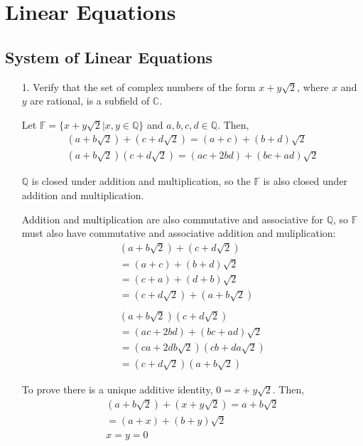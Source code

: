 \documentclass{article}
\begin{document}
\section{Linear Equations}

\setcounter{subsection}{1} %

\subsection{System of Linear Equations}

\begin{enumerate}[listparindent=\parindent]
\item[1.] Verify that the set of complex numbers of the form \(x + y\sqrt{2}\),
    where \(x\) and \(y\) are rational, is a subfield of \(\mathbb C\).

Let \(\mathbb F = \{x + y\sqrt{2} | x, y \in \mathbb Q\}\) and \(a, b, c, d \in \mathbb Q\). Then,
\begin{gather*}
    (a + b\sqrt{2}) + (c + d\sqrt{2}) = (a + c) + (b + d)\sqrt{2} \\
    (a + b\sqrt{2})(c + d\sqrt{2}) = (ac + 2bd) + (bc + ad)\sqrt{2}
\end{gather*}

\(\mathbb Q\) is closed under addition and multiplication,
so the \(\mathbb F\) is also closed under addition and multiplication.

Addition and multiplication are also commutative and associative for \(\mathbb Q\),
so \(\mathbb F\) must also have commutative and associative addition and muliplication:
\begin{gather*}
    (a + b\sqrt{2}) + (c + d\sqrt{2}) \\
    = (a + c) + (b + d)\sqrt{2} \\
    = (c + a) + (d + b)\sqrt{2} \\
    = (c + d\sqrt{2}) + (a + b\sqrt{2}) \\
    \\
    (a + b\sqrt{2})(c + d\sqrt{2}) \\
    = (ac + 2bd) + (bc + ad)\sqrt{2} \\
    = (ca + 2db\sqrt{2})(cb + da\sqrt{2}) \\
    = (c + d\sqrt{2})(a + b\sqrt{2})
\end{gather*}

To prove there is a unique additive identity, \(0 = x + y\sqrt{2}\). Then,
\begin{gather*}
    (a + b\sqrt{2}) + (x + y\sqrt{2}) = a + b\sqrt{2} \\
    = (a + x) + (b + y)\sqrt{2}\ \\
    x = y = 0
\end{gather*}


\end{enumerate}
\end{document}

